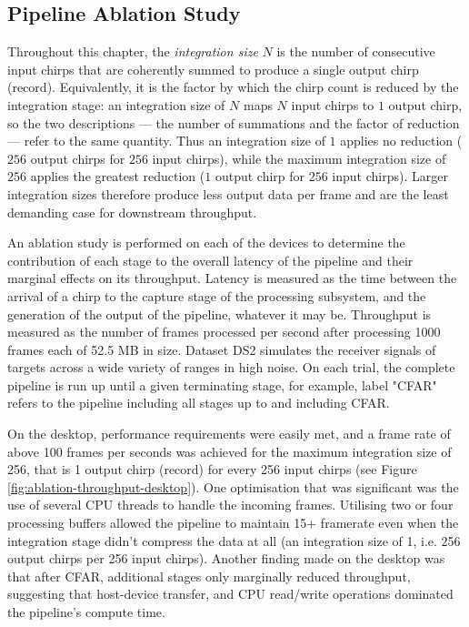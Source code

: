\subsection{Pipeline Ablation Study}

Throughout this chapter, the \emph{integration size} $N$ is the number of
consecutive input chirps that are coherently summed to produce a single output
chirp (record). Equivalently, it is the factor by which the chirp count is
reduced by the integration stage: an integration size of $N$ maps $N$ input
chirps to $1$ output chirp, so the two descriptions --- the number of
summations and the factor of reduction --- refer to the same quantity. Thus an
integration size of $1$ applies no reduction ($256$ output chirps for $256$
input chirps), while the maximum integration size of $256$ applies the greatest
reduction ($1$ output chirp for $256$ input chirps). Larger integration sizes
therefore produce less output data per frame and are the least demanding case
for downstream throughput.

An ablation study is performed on each of the devices 
to determine the contribution of
each stage to the overall latency of the pipeline and their
marginal effects on its throughput. Latency is measured as 
the time between the arrival of a chirp to the capture stage of
the processing subsystem, and the
generation of the output of the pipeline, whatever it may be. 
Throughput is measured as the number of frames processed per 
second after processing 1000 frames each of 52.5 MB in size. 
Dataset DS2 simulates the 
receiver signals of targets across a wide variety of ranges in
high noise. On each trial, the complete pipeline is run up until 
a given terminating stage, for example, label "CFAR" refers to the 
pipeline including all stages up to and including CFAR. 

On the desktop, performance requirements were easily met, and 
a frame rate of above 100 frames per seconds was achieved for the maximum integration 
size of 256, that is 1 output chirp (record) for every 256 input chirps 
(see Figure \ref{fig:ablation-throughput-desktop}). 
One optimisation that was significant was the use of several CPU threads to handle the incoming
frames. Utilising two or four processing buffers allowed the pipeline to maintain 15+ framerate 
even when the integration stage didn't compress the data at all (an integration size of 1, i.e. 
256 output chirps per 256 input chirps). 
Another finding 
made on the desktop was that after CFAR, additional stages only marginally reduced throughput, 
suggesting that host-device transfer, and CPU read/write operations dominated the pipeline's 
compute time. 

